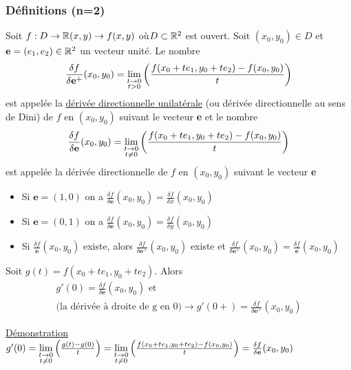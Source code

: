 \documentclass[12pt,a4paper]{article}
\begin{document}
\subsubsection{Définitions (n=2)}
\begin{boite}
	 Soit $f:D\to \mathbb{R}(x,y) \to f(x,y)$ où$ D\subset \mathbb{R}^2$ est ouvert. Soit $(x_0,y_0) \in D$ et $\textbf{e} = (e_1,e_2) \in \mathbb{R}^2$ un vecteur unité. Le nombre
	\begin{equation*}
		\frac{\delta f}{\delta \textbf{e}^+}(x_0,y_0) = \lim\limits_{\substack{t\to 0 \\ t> 0}}\left(\frac{f(x_0+te_1,y_0+te_2) - f(x_0,y_0)}{t}\right)
	\end{equation*}
	est appelée la  \uline{dérivée directionnelle unilatérale} (ou dérivée directionnelle au sens de Dini) de $f$ en $(x_0,y_0)$ suivant le vecteur \textbf{e} et le nombre
	\begin{equation*}
		\frac{\delta f}{\delta \textbf{e}}(x_0,y_0) = \lim\limits_{\substack{t\to 0 \\ t\neq 0}}\left(\frac{f(x_0+te_1,y_0+te_2) - f(x_0,y_0)}{t}\right)
	\end{equation*}
	est appelée la dérivée directionnelle de $f$ en $(x_0,y_0)$ suivant le vecteur \textbf{e}
\end{boite}
\begin{itemize}
	\item 	Si $\textbf{e}	= (1,0)$ on a $\frac{\delta f}{\delta \textbf{e}}(x_0,y_0) = \frac{\delta f}{\delta x}(x_0,y_0)$
	\item 	Si $\textbf{e}	= (0,1)$ on a $\frac{\delta f}{\delta \textbf{e}}(x_0,y_0) = \frac{\delta f}{\delta y}(x_0,y_0)$
\end{itemize}
\begin{itemize}
	\item 	Si $\frac{\delta f}{\textbf{e}}(x_0,y_0)$ existe, alors $\frac{\delta f}{\delta \textbf{e}^+}(x_0,y_0)$ existe et $\frac{\delta f}{\delta \textbf{e}^+}(x_0,y_0) = \frac{\delta f}{\textbf{e}}(x_0,y_0)$
\end{itemize}
\begin{boite}
	 Soit $g(t) = f(x_0 + te_1,y_0 + te_2)$. Alors 
	\begin{align*}
		g'(0) =  \frac{\delta f}{\delta \textbf{e}}(x_0,y_0) \text{ et}\\
		\text{(la dérivée à droite de g en 0)}\to g'(0+) =  \frac{\delta f}{\delta \textbf{e}^+}(x_0,y_0)
	\end{align*}
\end{boite}
\uline{Démonstration}\\
$g'(0) = \lim\limits_{\substack{t\to 0 \\ t\neq 0}}\left(\frac{g(t)-g(0)}{t}\right) = \lim\limits_{\substack{t\to 0 \\ t\neq 0}}\left(\frac{f(x_0+te_1,y_0+te_2) - f(x_0,y_0)}{t}\right) = \frac{\delta f}{\delta \textbf{e}}(x_0,y_0)$\\
\end{document}

